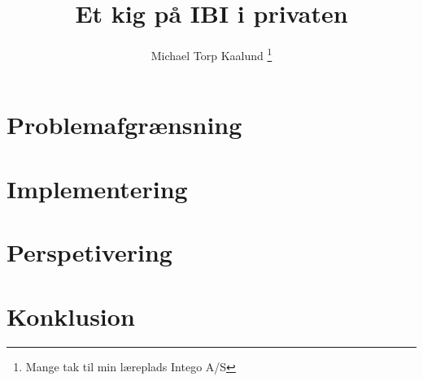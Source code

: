 \documentclass[12pt,a4paper,twoside]{article}
\title{Et kig på IBI i privaten}
\author{Michael Torp Kaalund \thanks{Mange tak til min læreplads Intego A/S}}
\begin{document}
    



    \tableofcontents

    \newpage

    

    \section{Problemafgrænsning}

    \section{Implementering}
        
        

    \section{Perspetivering}

    \section{Konklusion}

    \appendix

    
    
    

    
\end{document}
